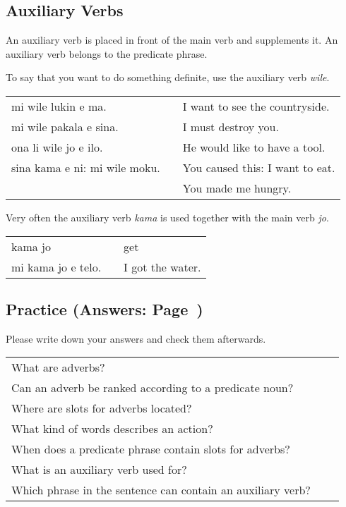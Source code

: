 %
%
\subsection*{Auxiliary Verbs}
%
%
An auxiliary verb is placed in front of the main verb and supplements it. 
An auxiliary verb belongs to the predicate phrase. 

To say that you want to do something definite, use the auxiliary verb \textit{wile}. 

\begin{supertabular}{p{5,5cm}|ll}
mi wile lukin e ma. && I want to see the countryside. \\
mi wile pakala e sina. && I must destroy you. \\
ona li wile jo e ilo. && He would like to have a tool. \\
sina kama e ni: mi wile moku. && You caused this: I want to eat. \\ && You made me hungry. \\
\end{supertabular} 

Very often the auxiliary verb \textit{kama} is used together with the main verb \textit{jo}.  

\begin{supertabular}{p{5,5cm}|ll}
kama jo && get \\
mi kama jo e telo. && I got the water. \\
\end{supertabular} 

%
\newpage
\subsection*{Practice (Answers: Page~\pageref{'adverbs'})}

Please write down your answers and check them afterwards. 

\begin{supertabular}{p{5,5cm}|ll}
What are adverbs? &&  \\ %
Can an adverb be ranked according to a predicate noun? &&   \\ %
Where are slots for adverbs located? &&  \\ %
What kind of words describes an action? &&  \\ %
When does a predicate phrase contain slots for adverbs? &&  \\ %
What is an auxiliary verb used for?  &&   \\ %
Which phrase in the sentence can contain an auxiliary verb? &&   \\ %
\end{supertabular}



